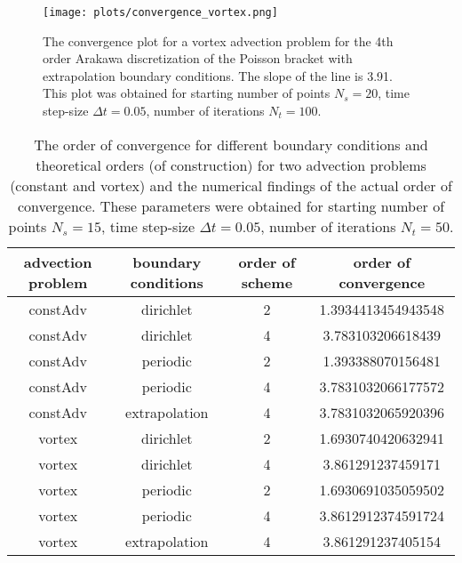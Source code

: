 \begin{figure}[h]
    \centering
    \texttt{[image: plots/convergence\_vortex.png]}
    \caption{The convergence plot for a vortex advection problem for the 4th order Arakawa discretization of the Poisson bracket with extrapolation boundary conditions. The slope of the line is 3.91. This plot was obtained for starting number of points $N_s=20$, time step-size $\Delta t = 0.05$, number of iterations $N_t = 100$.}
    \label{fig:convergence_vortex}
\end{figure}

\begin{table}[h]
    \centering
    \begin{tabular}{c|c|c|c}
        advection problem & boundary conditions & order of scheme & order of convergence \\
        \hline
        constAdv & dirichlet & 2 & 1.3934413454943548 \\
        constAdv & dirichlet & 4 & 3.783103206618439 \\
        constAdv & periodic & 2 & 1.393388070156481 \\
        constAdv & periodic & 4 & 3.7831032066177572 \\
        constAdv & extrapolation & 4 & 3.7831032065920396 \\
        vortex & dirichlet & 2 & 1.6930740420632941 \\
        vortex & dirichlet & 4 & 3.861291237459171 \\
        vortex & periodic & 2 & 1.6930691035059502 \\
        vortex & periodic & 4 & 3.8612912374591724 \\
        vortex & extrapolation & 4 & 3.861291237405154
    \end{tabular}
    \caption{The order of convergence for different boundary conditions and theoretical orders (of construction) for two advection problems (constant and vortex) and the numerical findings of the actual order of convergence. These parameters were obtained for starting number of points $N_s=15$, time step-size $\Delta t = 0.05$, number of iterations $N_t = 50$.}
    \label{tab:order-of-convergence}
\end{table}
